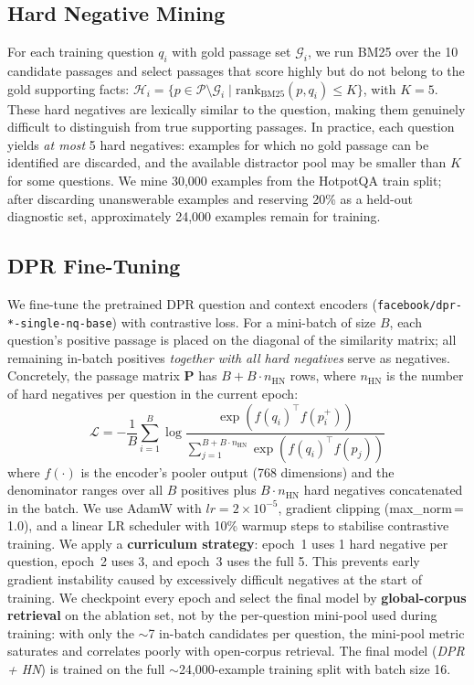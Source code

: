 \documentclass{llncs}
\begin{document}
\subsection{Hard Negative Mining}

For each training question $q_i$ with gold passage set $\mathcal{G}_i$,
we run BM25 over the 10 candidate passages and select passages that score
highly but do not belong to the gold supporting facts:
$\mathcal{H}_i = \{ p \in \mathcal{P} \setminus \mathcal{G}_i \mid
\mathrm{rank}_\mathrm{BM25}(p, q_i) \leq K \}$,
with $K = 5$. These hard negatives are lexically similar to the question,
making them genuinely difficult to distinguish from true supporting passages.
In practice, each question yields \emph{at most} 5 hard negatives: examples
for which no gold passage can be identified are discarded, and the available
distractor pool may be smaller than $K$ for some questions. We mine 30{,}000
examples from the HotpotQA train split; after discarding unanswerable
examples and reserving 20\% as a held-out diagnostic set, approximately
24{,}000 examples remain for training.

\subsection{DPR Fine-Tuning}

We fine-tune the pretrained DPR question and context encoders
(\texttt{facebook/dpr-*-single-nq-base}) with contrastive loss. For a
mini-batch of size $B$, each question's positive passage is placed on the
diagonal of the similarity matrix; all remaining in-batch positives
\emph{together with all hard negatives} serve as negatives. Concretely,
the passage matrix $\mathbf{P}$ has $B + B \cdot n_\mathrm{HN}$ rows, where
$n_\mathrm{HN}$ is the number of hard negatives per question in the current
epoch:
\begin{equation}
    \mathcal{L} = -\frac{1}{B} \sum_{i=1}^{B}
    \log \frac{\exp\!\left(f(q_i)^\top f(p^+_i)\right)}
         {\displaystyle\sum_{j=1}^{B + B \cdot n_\mathrm{HN}}
          \exp\!\left(f(q_i)^\top f(p_j)\right)}
\end{equation}
where $f(\cdot)$ is the encoder's pooler output (768 dimensions) and the
denominator ranges over all $B$ positives plus $B \cdot n_\mathrm{HN}$
hard negatives concatenated in the batch. We use AdamW with
$lr = 2\times10^{-5}$, gradient clipping (max\_norm\,=\,1.0), and a linear
LR scheduler with 10\% warmup steps to stabilise contrastive training. We
apply a \textbf{curriculum strategy}: epoch~1 uses 1 hard negative per
question, epoch~2 uses 3, and epoch~3 uses the full 5. This prevents early
gradient instability caused by excessively difficult negatives at the start
of training. We checkpoint every epoch and select the final model by
\textbf{global-corpus retrieval} on the ablation set, not by the per-question
mini-pool used during training: with only the $\sim$7 in-batch candidates per
question, the mini-pool metric saturates and correlates poorly with
open-corpus retrieval. The final model (\textit{DPR + HN}) is trained on
the full $\sim$24{,}000-example training split with batch size 16.
\end{document}
